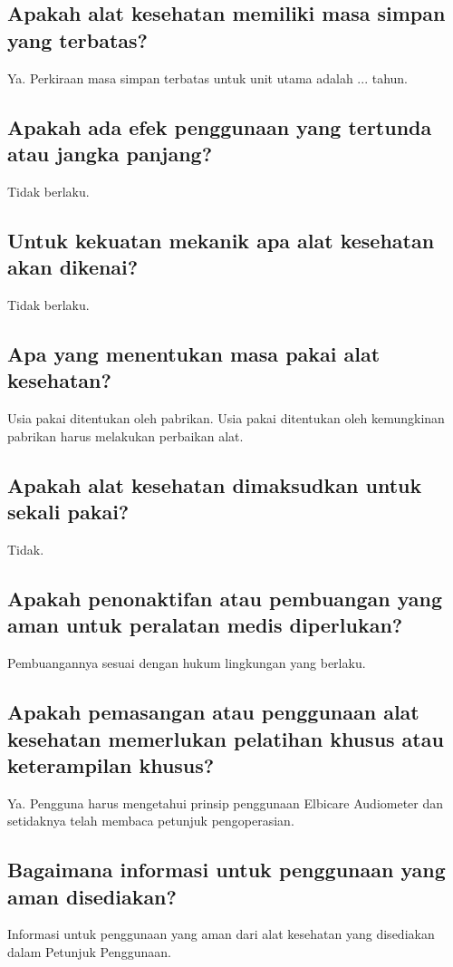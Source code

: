 \documentclass[11pt,a4paper,twoside,onecolumn]{book}
\begin{document}
			\subsection{Apakah alat kesehatan memiliki masa simpan yang terbatas?}
			Ya. Perkiraan masa simpan terbatas untuk unit utama adalah ... tahun.
			
			\subsection{Apakah ada efek penggunaan yang tertunda atau jangka panjang?}
			Tidak berlaku.
			
			\subsection{Untuk kekuatan mekanik apa alat kesehatan akan dikenai?}
			Tidak berlaku.
			
			\subsection{Apa yang menentukan masa pakai alat kesehatan?}
			Usia pakai ditentukan oleh pabrikan. Usia pakai ditentukan oleh kemungkinan pabrikan harus melakukan perbaikan alat.
			
			\subsection{Apakah alat kesehatan dimaksudkan untuk sekali pakai?}
			Tidak.
			
			\subsection{Apakah penonaktifan atau pembuangan yang aman untuk peralatan medis diperlukan?}
			Pembuangannya sesuai dengan hukum lingkungan yang berlaku.
			
			\subsection{Apakah pemasangan atau penggunaan alat kesehatan memerlukan pelatihan khusus atau keterampilan khusus?}
			Ya. Pengguna harus mengetahui prinsip penggunaan Elbicare Audiometer dan setidaknya telah membaca petunjuk pengoperasian.
			
			\subsection{Bagaimana informasi untuk penggunaan yang aman disediakan?}
			Informasi untuk penggunaan yang aman dari alat kesehatan yang disediakan dalam Petunjuk Penggunaan.
			
\end{document}

